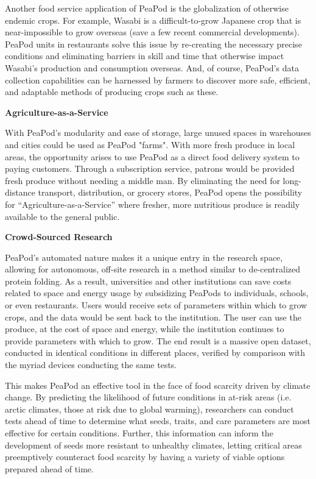 \documentclass{report}
\begin{document}
Another food service application of PeaPod is the globalization of otherwise endemic crops. For example, Wasabi is a difficult-to-grow Japanese crop that is near-impossible to grow overseas (save a few recent commercial developments). PeaPod units in restaurants solve this issue by re-creating the necessary precise conditions and eliminating barriers in skill and time that otherwise impact Wasabi's production and consumption overseas. And, of course, PeaPod's data collection capabilities can be harnessed by farmers to discover more safe, efficient, and adaptable methods of producing crops such as these.

\textbf{Agriculture-as-a-Service}

With PeaPod’s modularity and ease of storage, large unused spaces in warehouses and cities could be used as PeaPod "farms". With more fresh produce in local areas, the opportunity arises to use PeaPod as a direct food delivery system to paying customers. Through a subscription service, patrons would be provided fresh produce without needing a middle man. By eliminating the need for long-distance transport, distribution, or grocery stores, PeaPod opens the possibility for “Agriculture-as-a-Service” where fresher, more nutritious produce is readily available to the general public.

\textbf{Crowd-Sourced Research} %

PeaPod's automated nature makes it a unique entry in the research space, allowing for autonomous, off-site research in a method similar to de-centralized protein folding. As a result, universities and other institutions can save costs related to space and energy usage by subsidizing PeaPods to individuals, schools, or even restaurants. Users would receive sets of parameters within which to grow crops, and the data would be sent back to the institution. The user can use the produce, at the cost of space and energy, while the institution continues to provide parameters with which to grow. The end result is a massive open dataset, conducted in identical conditions in different places, verified by comparison with the myriad devices conducting the same tests.

This makes PeaPod an effective tool in the face of food scarcity driven by climate change. By predicting the likelihood of future conditions in at-risk areas (i.e. arctic climates, those at risk due to global warming), researchers can conduct tests ahead of time to determine what seeds, traits, and care parameters are most effective for certain conditions. Further, this information can inform the development of seeds more resistant to unhealthy climates, letting critical areas preemptively counteract food scarcity by having a variety of viable options prepared ahead of time.
\end{document}
